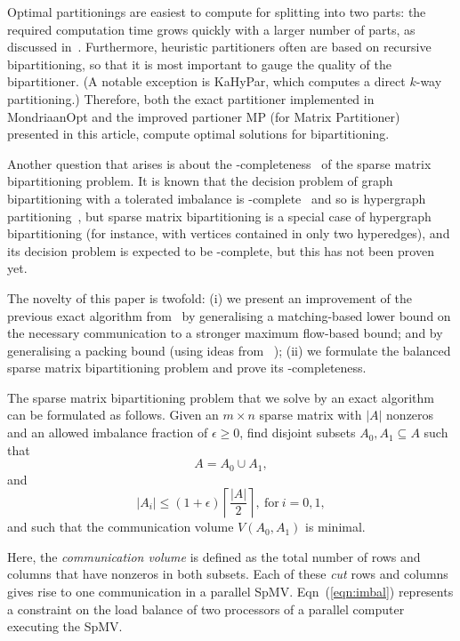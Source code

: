 Optimal partitionings are easiest to compute for splitting into two parts:
the required computation time
grows quickly with a larger number of parts, as discussed in~\cite{pelt15}.
Furthermore, heuristic partitioners often are based on recursive bipartitioning,
so that it is most important to gauge the quality of the bipartitioner.
(A notable exception is KaHyPar, which computes a direct $k$-way partitioning.)
Therefore, both the exact partitioner implemented in MondriaanOpt and the improved partioner 
MP (for Matrix Partitioner)
presented in this article, compute optimal solutions for bipartitioning.

Another question that arises is about the \NP-completeness~\cite{garey79}
of the sparse matrix bipartitioning problem.
It is known that the decision problem of
graph bipartitioning with a tolerated imbalance
is \NP-complete~\cite[Theorem 3.1]{bui92}
and so is hypergraph partitioning~\cite[Chapter 6]{lengauer90}, 
but sparse matrix bipartitioning is a special
case of hypergraph bipartitioning (for instance, with vertices contained in only two hyperedges),
and its decision problem is expected to be \NP-complete,
but this has not been proven yet.

The novelty of this paper is twofold: (i) we present an improvement
of the previous exact algorithm from~\cite{pelt15} by generalising
a matching-based lower bound on the necessary communication
to a stronger maximum flow-based bound; and by generalising a packing
bound (using ideas from ~\cite{delling14}); (ii) we formulate the balanced sparse matrix bipartitioning problem
and prove its \NP-completeness.

The sparse matrix bipartitioning problem that
we solve by an exact algorithm can be formulated as follows.
Given an $m \times n$ sparse matrix with $|A|$ nonzeros
and an allowed imbalance fraction of $\epsilon \geq 0$,
find disjoint subsets $A_0, A_1 \subseteq A$ such that
\begin{equation}
A=A_0 \cup A_1,
\end{equation}
and
\begin{equation}
\label{eqn:imbal}
|A_i| \leq (1+\epsilon ) \left\lceil \frac{|A|}{2} \right\rceil ,
~\mathrm{for}~ i=0,1,
\end{equation}
and such that the communication volume $V(A_0,A_1)$ is minimal.

Here, the \emph{communication volume} is
defined as the total number of rows and columns 
that have nonzeros in both subsets.
Each of these \emph{cut} rows and columns gives rise to one communication
in a parallel SpMV.
Eqn~(\ref{eqn:imbal}) represents a constraint on the load balance
of two processors of a parallel computer executing the SpMV. 

